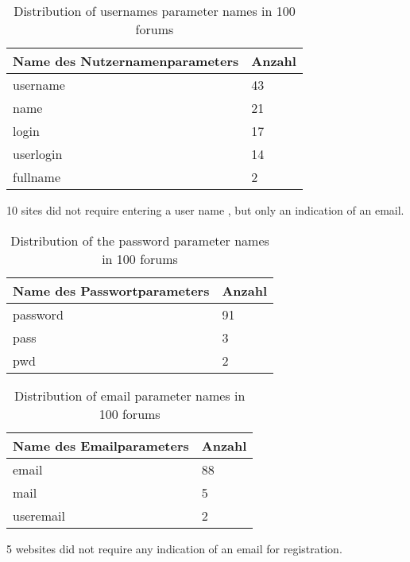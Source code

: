 
\begin{table}[h!]
\centering 
\begin{tabular}{ | p{7cm} | p{3cm}|} \hline
Name des Nutzernamenparameters & Anzahl \\ \hline
username & 43 \\ \hline
name & 21 \\ \hline
login & 17 \\ \hline
userlogin & 14 \\ \hline
fullname & 2 \\ \hline
\end{tabular}
\caption{Distribution of usernames parameter names in 100 forums}
\end{table}

10 sites did not require entering a user name , but only an indication of an email.

\begin{table}[h!]
\centering 
\begin{tabular}{ | p{7cm} | p{3cm}|} \hline
Name des Passwortparameters & Anzahl \\ \hline
password & 91 \\ \hline
pass & 3 \\ \hline
pwd & 2 \\ \hline
\end{tabular}
\caption{Distribution of the password parameter names in 100 forums}
\end{table}

\begin{table}[h!]
\centering 
\begin{tabular}{ | p{7cm} | p{3cm}|} \hline
Name des Emailparameters & Anzahl \\ \hline
email & 88 \\ \hline
mail & 5 \\ \hline
useremail & 2 \\ \hline
\end{tabular}
\caption{Distribution of email parameter names in 100 forums}
\end{table}

5 websites did not require any indication of an email for registration.

